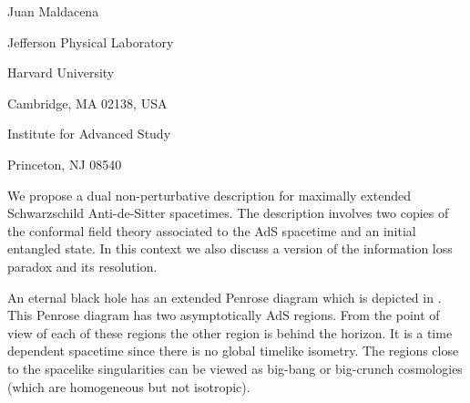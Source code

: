 \lref{}

\lref{}


\baselineskip=12pt

\centerline{ Juan Maldacena }
\centerline{ Jefferson Physical Laboratory}
\centerline{Harvard University}
\centerline{Cambridge, MA 02138, USA}
\centerline{ Institute for Advanced Study}
\centerline{Princeton, NJ 08540}

We propose a dual non-perturbative description for  maximally 
extended Schwarzschild Anti-de-Sitter spacetimes.
The description involves 
two copies of the conformal field theory associated to the AdS spacetime
and an  initial entangled state. In this context  we 
also discuss a version of the  information loss
paradox  and its resolution. 


\vfill\eject


\ifig{}
{}

 An eternal black hole has an extended Penrose diagram which is 
depicted in  \penrose .  
 This Penrose diagram has two asymptotically 
AdS regions. From the point of view of each of these regions the other
region is behind the horizon. It   is a  time 
dependent spacetime  since there is no global  timelike isometry. 
The regions close to the spacelike singularities can be viewed 
as big-bang or big-crunch cosmologies (which are homogeneous but
not isotropic). 

